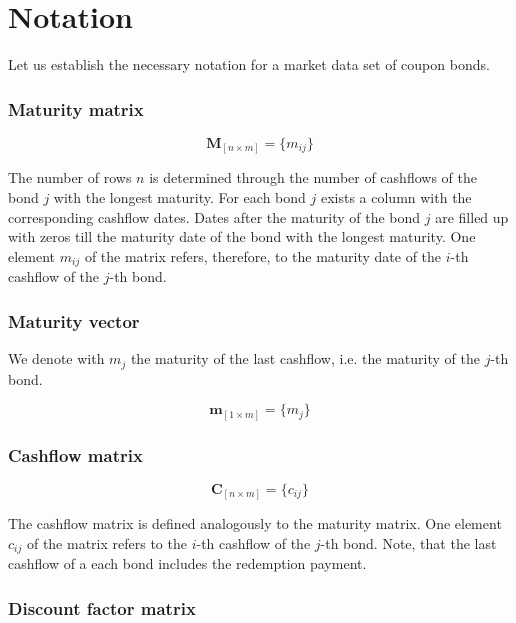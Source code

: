 \section{Notation}
\label{sec:notation}

Let us establish the necessary notation for a market data set of coupon bonds.

\subsubsection*{Maturity matrix}

\begin{equation}\label{maturitym}
\bm{M}_{\left[n\times m\right]}= \{m_{ij}\}
\end{equation}

The number of rows $n$ is determined through the number of cashflows of the bond $j$ with the longest maturity. For each bond $j$ exists a column with the corresponding cashflow dates. Dates after the maturity of the bond $j$ are filled up with zeros till the maturity date of the bond with the longest maturity. One element $m_{ij}$ of the matrix  refers, therefore, to the maturity date of  the $i$-th cashflow of the $j$-th bond. 

\subsubsection*{Maturity vector}

We denote with $m_j$ the maturity of the last cashflow, i.e. the maturity of the $j$-th bond.

\begin{equation}\label{weights}
    \bm{m}_{\left[1\times m\right]}= \{m_j\}
\end{equation}

\subsubsection*{Cashflow matrix}

 \begin{equation}\label{cashflowm}
\bm{C}_{\left[n\times m\right]}= \{c_{ij}\}
\end{equation}

 The cashflow matrix is defined analogously to the maturity matrix.  One element $c_{ij}$  of the matrix refers to the $i$-th cashflow of the $j$-th bond. Note, that the last cashflow of a each bond includes the redemption payment.

\subsubsection*{Discount factor matrix}

